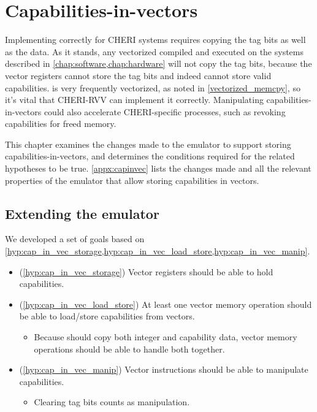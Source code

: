 \documentclass[../thesis]{subfiles}
\begin{document}
\chapter{Capabilities-in-vectors\label{chap:capinvec}}
Implementing  correctly for CHERI systems requires copying the tag bits as well as the data.
As it stands, any vectorized  compiled and executed on the systems described in \cref{chap:software,chap:hardware} will not copy the tag bits, because the vector registers cannot store the tag bits and indeed cannot store valid capabilities.
 is very frequently vectorized, as noted in \cref{vectorized_memcpy}, so it's vital that CHERI-RVV can implement it correctly.
Manipulating capabilities-in-vectors could also accelerate CHERI-specific processes, such as revoking capabilities for freed memory\cite{xiaCHERIvokeCharacterisingPointer2019}.

This chapter examines the changes made to the emulator to support storing capabilities-in-vectors, and determines the conditions required for the related hypotheses to be true.
\cref{appx:capinvec} lists the changes made and all the relevant properties of the emulator that allow storing capabilities in vectors.

\section{Extending the emulator}
We developed a set of goals based on \cref{hyp:cap_in_vec_storage,hyp:cap_in_vec_load_store,hyp:cap_in_vec_manip}.
\begin{itemize}
    \item (\cref{hyp:cap_in_vec_storage}) Vector registers should be able to hold capabilities.
    \item (\cref{hyp:cap_in_vec_load_store}) At least one vector memory operation should be able to load/store capabilities from vectors.
    \begin{itemize}
        \item Because  should copy both integer and capability data, vector memory operations should be able to handle both together.
    \end{itemize}
    \item (\cref{hyp:cap_in_vec_manip}) Vector instructions should be able to manipulate capabilities.
    \begin{itemize}
        \item Clearing tag bits counts as manipulation.
    \end{itemize}
\end{itemize}
\end{document}
